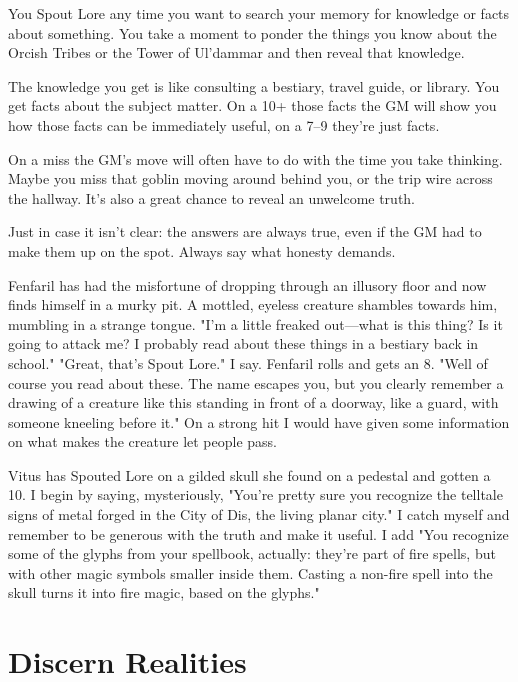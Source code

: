 You Spout Lore any time you want to search your memory for knowledge or facts about something. You take a moment to ponder the things you know about the Orcish Tribes or the Tower of Ul'dammar and then reveal that knowledge.

 

The knowledge you get is like consulting a bestiary, travel guide, or library. You get facts about the subject matter. On a 10+ those facts the GM will show you how those facts can be immediately useful, on a 7–9 they're just facts.

 

On a miss the GM's move will often have to do with the time you take thinking. Maybe you miss that goblin moving around behind you, or the trip wire across the hallway. It's also a great chance to reveal an unwelcome truth.

 

Just in case it isn't clear: the answers are always true, even if the GM had to make them up on the spot. Always say what honesty demands.

 
\startExample
Fenfaril has had the misfortune of dropping through an illusory floor and now finds himself in a murky pit. A mottled, eyeless creature shambles towards him, mumbling in a strange tongue. "I'm a little freaked out—what is this thing? Is it going to attack me? I probably read about these things in a bestiary back in school." "Great, that's Spout Lore." I say. Fenfaril rolls and gets an 8. "Well of course you read about these. The name escapes you, but you clearly remember a drawing of a creature like this standing in front of a doorway, like a guard, with someone kneeling before it." On a strong hit I would have given some information on what makes the creature let people pass.
\stopExample
 
\startExample
Vitus has Spouted Lore on a gilded skull she found on a pedestal and gotten a 10. I begin by saying, mysteriously, "You're pretty sure you recognize the telltale signs of metal forged in the City of Dis, the living planar city." I catch myself and remember to be generous with the truth and make it useful. I add "You recognize some of the glyphs from your spellbook, actually: they're part of fire spells, but with other magic symbols smaller inside them. Casting a non-fire spell into the skull turns it into fire magic, based on the glyphs."
\stopExample
 
\section{Discern Realities}    
 

